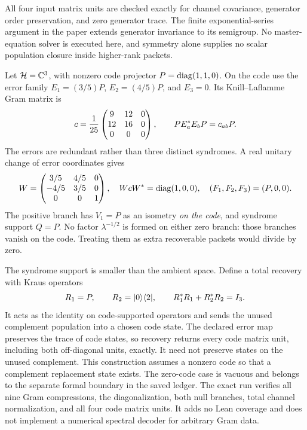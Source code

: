 All four input matrix units are checked exactly for channel covariance, generator order preservation, and zero generator trace. The finite exponential-series argument in the paper extends generator invariance to its semigroup. No master-equation solver is executed here, and symmetry alone supplies no scalar population closure inside higher-rank packets.

Let $\mathcal H=\mathbb C^3$, with nonzero code projector $P=\operatorname{diag}(1,1,0)$. On the code use the error family $E_1=(3/5)P$, $E_2=(4/5)P$, and $E_3=0$. Its Knill--Laflamme Gram matrix is
\[
c=\frac1{25}\begin{pmatrix}9&12&0\\12&16&0\\0&0&0\end{pmatrix},
\qquad PE_a^*E_bP=c_{ab}P.
\]
The errors are redundant rather than three distinct syndromes. A real unitary change of error coordinates gives
\[
W=\begin{pmatrix}3/5&4/5&0\\-4/5&3/5&0\\0&0&1\end{pmatrix},
\quad WcW^*=\operatorname{diag}(1,0,0),
\quad(F_1,F_2,F_3)=(P,0,0).
\]
The positive branch has $V_1=P$ as an isometry \emph{on the code}, and syndrome support $Q=P$. No factor $\lambda^{-1/2}$ is formed on either zero branch: those branches vanish on the code. Treating them as extra recoverable packets would divide by zero.

The syndrome support is smaller than the ambient space. Define a total recovery with Kraus operators
\[
R_1=P,\qquad R_2=\lvert 0\rangle\langle 2\rvert,
\qquad R_1^*R_1+R_2^*R_2=I_3.
\]
It acts as the identity on code-supported operators and sends the unused complement population into a chosen code state. The declared error map preserves the trace of code states, so recovery returns every code matrix unit, including both off-diagonal units, exactly. It need not preserve states on the unused complement.
This construction assumes a nonzero code so that a complement replacement state exists. The zero-code case is vacuous and belongs to the separate formal boundary in the saved ledger. The exact run verifies all nine Gram compressions, the diagonalization, both null branches, total channel normalization, and all four code matrix units. It adds no Lean coverage and does not implement a numerical spectral decoder for arbitrary Gram data.


